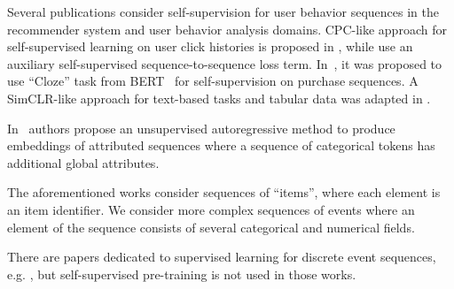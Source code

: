 \documentclass[sigconf]{acmart}
\newcommand{\attn}[1]{#1}
\newcommand{\revised}[1]{#1}
\begin{document}


Several publications consider self-supervision for user behavior sequences in the recommender system
and user behavior analysis domains. CPC-like approach for self-supervised learning on user click
histories is proposed in \citep{Zhou2020ContrastiveLF}, while \citep{Ma2020DisentangledSI} use
an auxiliary self-supervised sequence-to-sequence loss term.
%
In~\citep{Zhou2020S3RecSL}, it was proposed to use ``Cloze'' task from BERT~\citep{Devlin2019BERTPO}
for self-supervision on purchase sequences.
A SimCLR-like approach for text-based tasks and tabular data was adapted in \citep{Yao2020SelfsupervisedLF}.
\revised{
    In~\citep{Zhuang2019AttributedSE} authors propose an unsupervised autoregressive method
    to produce embeddings of attributed sequences where a sequence of categorical tokens has
    additional global attributes.
}
The aforementioned works consider sequences of ``items'', where each element is an item identifier.
We consider more complex sequences of events where an element of the sequence consists of several
categorical and numerical fields.

There are papers dedicated to supervised learning for discrete event sequences, e.g. \citep{Wiese2009CreditCT,Tobback2019RetailCS,Babaev2019ETRNNAD,chatterjee2003modeling,sinha2014your},
but self-supervised pre-training is not used in those works.
\end{document}
